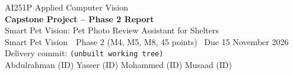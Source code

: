 \documentclass[11pt,a4paper]{article}
\newcommand{\teamname}{Smart Pet Vision}
\newcommand{\projecttitle}{Smart Pet Vision: Pet Photo Review Assistant for Shelters}
\newcommand{\idYasser}{(ID)}\newcommand{\idMohammed}{(ID)}%
\newcommand{\idMusaad}{(ID)}\newcommand{\idAbdulrahman}{(ID)}}
\newcommand{\deliverycommit}{(unbuilt working tree)}\newcommand{\deliverybranch}{(none)}}
\begin{document}
\begin{center}
  {\large AI251P Applied Computer Vision}\\[4pt]
  {\LARGE\bfseries Capstone Project -- Phase 2 Report}\\[6pt]
  {\Large \projecttitle}\\[4pt]
  \teamname\ \textperiodcentered\ Phase 2 (M4, M5, M8, 45 points) \textperiodcentered\ Due 15 November 2026\\[3pt]
  {\footnotesize Delivery commit: \texttt{\deliverycommit}}\\[2pt]
  {\footnotesize Abdulrahman \idAbdulrahman{} \quad Yasser \idYasser{} \quad Mohammed \idMohammed{} \quad Musaad \idMusaad{}}
\end{center}
\vspace{4pt}
\end{document}
